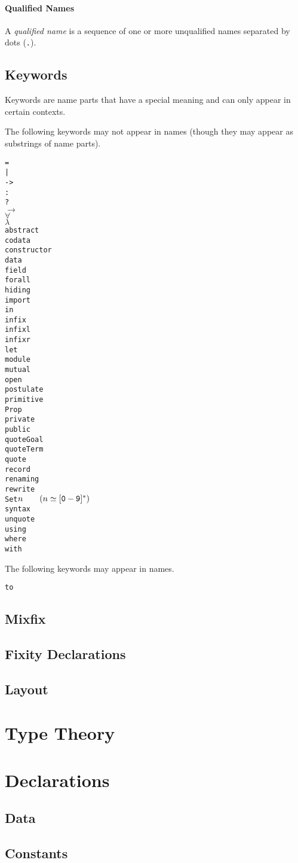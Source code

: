 \documentclass{article}
\begin{document}
\paragraph{Qualified Names}
A \emph{qualified name} is a sequence of one or more unqualified names separated by dots (\texttt{.}).
\subsection{Keywords}
\label{sec:keywords}
Keywords are name parts that have a special meaning and can only appear in certain contexts.

The following keywords may not appear in names (though they may appear as substrings of name parts).
\begin{multicols}{3}
\begin{alltt}
=
|
->
:
?
\(\to\)
\(\forall\)
\(\lambda\)
abstract
codata
constructor
data
field
forall
hiding
import
in
infix
infixl
infixr
let
module
mutual
open
postulate
primitive
Prop
private
public
quoteGoal
quoteTerm
quote
record
renaming
rewrite
Set\(n\qquad(n\simeq\mathtt{[0-9]\sp{*}})\)
syntax
unquote
using
where
with
\end{alltt}
\end{multicols}
The following keywords may appear in names.
\begin{alltt}
to
\end{alltt}
\subsection{Mixfix}
\subsection{Fixity Declarations}
\subsection{Layout}
\label{sec:layout}
\section{Type Theory}
\section{Declarations}
\subsection{Data}
\subsection{Constants}
\end{document}
